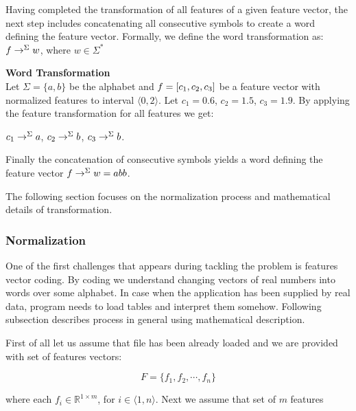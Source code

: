\documentclass{mini}
\begin{document}
Having completed the transformation of all features of a given feature vector, the next step includes concatenating all consecutive symbols to create a word defining the feature vector. Formally, we define the word transformation as: $f \rightarrow^{\Sigma} w$, where $w \in \Sigma^*$ 

        
\begin{example} {\bf Word Transformation}\\
    Let $\Sigma =\{a,b\}$ be the alphabet and $f = [c_{1},c_{2},c_{3}]$ be a feature vector with normalized features to interval $\langle 0,2 \rangle$.
    Let $c_{1}=0.6$, $c_{2} = 1.5$, $c_{3} = 1.9$.
    By applying the feature transformation for all features we get:
    \begin{center}
        $c_{1} \rightarrow^{\Sigma} a$,
        $c_{2} \rightarrow^{\Sigma} b$,
        $c_{3} \rightarrow^{\Sigma} b$.
    \end{center}
    Finally the concatenation of consecutive symbols yields a word defining the feature vector $f \rightarrow^{\Sigma} w = abb$.
\end{example}

The following section focuses on the normalization process and mathematical details of transformation.

\subsubsection{Normalization} \label{sec:lan_theory_word_transf_norm}
One of the first challenges that appears during tackling the problem is features vector coding. By coding we understand changing vectors of real numbers into words over some alphabet. In case when the application has been supplied by real data, program needs to load tables and interpret them somehow. Following subsection describes process in general using mathematical description.

First of all let us assume that file has been already loaded and we are provided with set of features vectors: 

\[ F = \{ f_1 , f_2, \cdots , f_n \} \]

where each $f_i \in \mathbb{R}^{1 \times m}$, for $i \in \langle 1,n \rangle$.
Next we assume that set of $m$ features 
\end{document}
